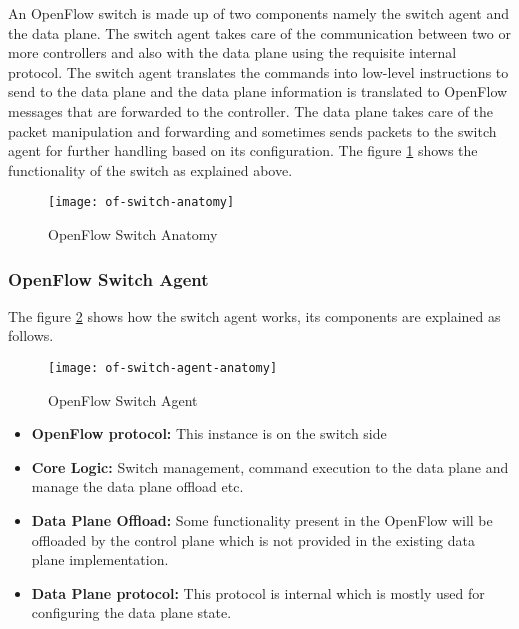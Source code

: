  An OpenFlow switch is made up of two components namely the switch agent and the data plane. The switch agent takes care of the communication between two or more controllers and also with the data plane using the requisite internal protocol. The switch agent translates the commands into low-level instructions to send to the data plane and the data plane information is translated to OpenFlow messages that are forwarded to the controller. The data plane takes care of the packet manipulation and forwarding and sometimes sends packets to the switch agent for further handling based on its configuration. The figure \ref{fig:Of_switch_anatomy} shows the functionality of the switch as explained above.
 
\begin{figure}
 	\centering
 	\texttt{[image: of-switch-anatomy]}
 	\caption{OpenFlow Switch Anatomy \cite{Of_Switch_img}} \label{fig:Of_switch_anatomy}
 	\vspace{-10pt}
\end{figure}
 
\subsubsection{OpenFlow Switch Agent \cite{Opnflow_switch}} \label{Of_switch_agent}
 The figure \ref{fig:Of_switch_agent} shows how the switch agent works, its components are explained as follows.
 
\begin{figure}
 	\centering
 	\texttt{[image: of-switch-agent-anatomy]}
 	\caption{OpenFlow Switch Agent \cite{Of_Switch_agent_img}} \label{fig:Of_switch_agent}
 	\vspace{-10pt}
\end{figure}

\begin{itemize}
	\item \textbf{OpenFlow protocol:} This instance is on the switch side
	\item \textbf{Core Logic:} Switch management, command execution to the data plane and manage the data plane offload etc.
	\item \textbf{Data Plane Offload:} Some functionality present in the OpenFlow will be offloaded by the control plane which is not provided in the existing data plane implementation.
	\item \textbf{Data Plane protocol:} This protocol is internal which is mostly used for configuring the data plane state.
	
\end{itemize}

